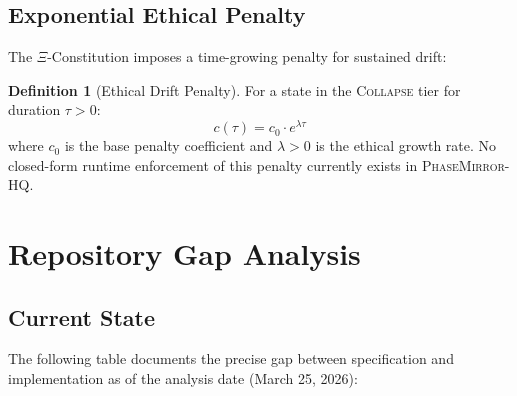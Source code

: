 \documentclass[11pt,letterpaper]{article}
\theoremstyle{definition}
\newtheorem{definition}{Definition}[section]
\theoremstyle{remark}
\newcommand{\pmhq}{\textsc{PhaseMirror-HQ}}
\newcommand{\xicons}{\(\Xi\)-Constitution}
\begin{document}
\subsection{Exponential Ethical Penalty}

The \xicons{} imposes a time-growing penalty for sustained drift:

\begin{definition}[Ethical Drift Penalty]
For a state in the \textsc{Collapse} tier for duration \(\tau > 0\):
\[
  c(\tau) = c_0 \cdot e^{\lambda \tau}
\]
where \(c_0\) is the base penalty coefficient and \(\lambda > 0\)
is the ethical growth rate. No closed-form runtime enforcement
of this penalty currently exists in \pmhq{}.
\end{definition}

\section{Repository Gap Analysis}

\subsection{Current State}

The following table documents the precise gap between specification
and implementation as of the analysis date (March 25, 2026):
\end{document}
